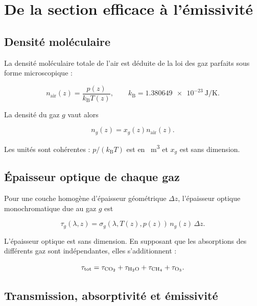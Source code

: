 \documentclass[11pt,a4paper]{article}
\begin{document}
\section{De la section efficace à l'émissivité}

\subsection{Densité moléculaire}

La densité moléculaire totale de l'air est déduite de la loi des gaz parfaits
sous forme microscopique :

\begin{equation}
  n_{\mathrm{air}}(z)=\frac{p(z)}{k_{\mathrm B}T(z)},
  \qquad
  k_{\mathrm B}=\SI{1.380649e-23}{\joule\per\kelvin}.
  \label{eq:densite_air}
\end{equation}

La densité du gaz $g$ vaut alors

\begin{equation}
  n_g(z)=x_g(z)n_{\mathrm{air}}(z).
  \label{eq:densite_gaz}
\end{equation}

Les unités sont cohérentes : $p/(k_{\mathrm B}T)$ est en
\si{\per\metre\cubed} et $x_g$ est sans dimension.

\subsection{Épaisseur optique de chaque gaz}

Pour une couche homogène d'épaisseur géométrique $\Delta z$, l'épaisseur
optique monochromatique due au gaz $g$ est

\begin{equation}
  \tau_g(\lambda,z)
  = \sigma_g(\lambda,T(z),p(z))\,n_g(z)\,\Delta z.
  \label{eq:tau_gaz}
\end{equation}

L'épaisseur optique est sans dimension. En supposant que les absorptions des
différents gaz sont indépendantes, elles s'additionnent :

\begin{equation}
  \tau_{\mathrm{tot}}
  = \tau_{\ce{CO2}}+\tau_{\ce{H2O}}
  +\tau_{\ce{CH4}}+\tau_{\ce{O3}}.
  \label{eq:tau_total}
\end{equation}

\subsection{Transmission, absorptivité et émissivité}
\end{document}
